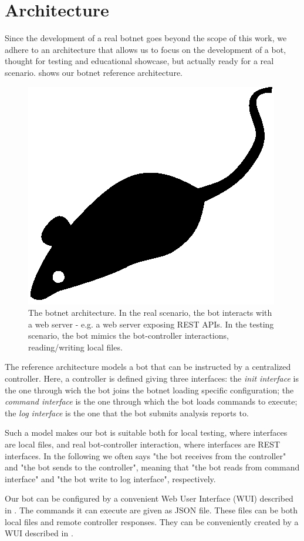 \section{Architecture}
\label{sec:architecture}

Since the development of a real botnet goes beyond the scope of this work, we adhere to an architecture that allows us to focus on the development of a bot, thought for testing and educational showcase, but actually ready for a real scenario.  shows our botnet reference architecture.

\begin{figure}[tp]
  \centering
  \includegraphics{./fig/acmlarge-mouse}
  \caption{The botnet architecture. In the real scenario, the bot interacts with a web server - e.g. a web server exposing REST APIs. In the testing scenario, the bot mimics the bot-controller interactions, reading/writing local files.}
    \label{fig:botnet-architecture}
\end{figure}

The reference architecture models a bot that can be instructed by a centralized controller.
Here, a controller is defined giving three interfaces: the \textit{init interface} is the one through wich the bot joins the botnet loading specific configuration; the \textit{command interface} is the one through which the bot loads commands to execute; the \textit{log interface} is the one that the bot submits analysis reports to.

Such a model makes our bot is suitable both for local testing, where interfaces are local files, and real bot-controller interaction, where interfaces are REST interfaces. In the following we often says "the bot receives from the controller" and "the bot sends to the controller", meaning that "the bot reads from command interface" and "the bot write to log interface", respectively.

Our bot can be configured by a convenient Web User Interface (WUI) described in . The commands it can execute are given as JSON file. These files can be both local files and remote controller responses. They can be conveniently created by a WUI described in .
